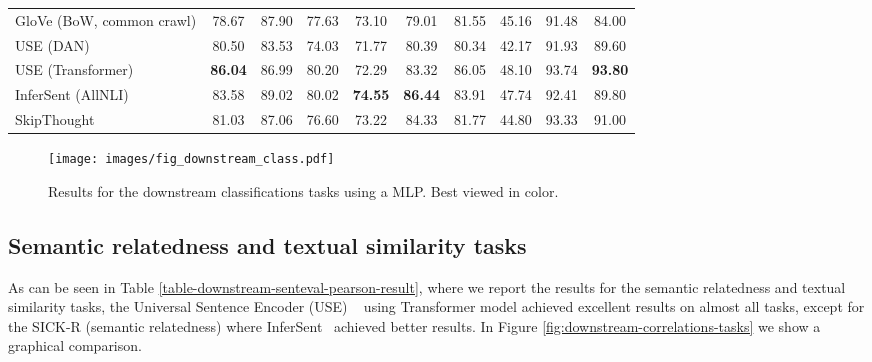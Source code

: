 \documentclass{article}
\begin{document}
\begin{table}[!htb]
{\begin{tabular}{lccccccccc}
GloVe (BoW, common crawl)                & 78.67 & 87.90 & 77.63 & 73.10 & 79.01  & 81.55 & 45.16 & 91.48 & 84.00 \\
USE (DAN)         & 80.50 & 83.53 & 74.03 & 71.77 & 80.39  & 80.34 & 42.17 & 91.93 & 89.60 \\
USE (Transformer)    & \textbf{86.04} & 86.99 & 80.20 & 72.29 & 83.32  & 86.05 & 48.10 & 93.74 & \textbf{93.80} \\
InferSent (AllNLI)            & 83.58 & 89.02 & 80.02 & \textbf{74.55} & \textbf{86.44}  & 83.91 & 47.74 & 92.41 & 89.80 \\
SkipThought          & 81.03 & 87.06 & 76.60 & 73.22 & 84.33  & 81.77 & 44.80 & 93.33 & 91.00 \\
\bottomrule
\end{tabular}}
\end{table}


\begin{figure}[!htb]
 \texttt{[image: images/fig\_downstream\_class.pdf]}
\caption{Results for the downstream classifications tasks using a MLP. Best viewed in color.}
\label{fig:downstream-classification-tasks}
\end{figure}





\subsection{Semantic relatedness and textual similarity tasks}
As can be seen in Table \ref{table-downstream-senteval-pearson-result}, where we report the results for the semantic relatedness and textual similarity tasks, the Universal Sentence Encoder (USE) ~\cite{DBLP:journals/corr/abs-1803-11175} using Transformer model achieved excellent results on almost all tasks, except for the SICK-R (semantic relatedness) where InferSent~\cite{conneau2017supervised} achieved better results.
In Figure \ref{fig:downstream-correlations-tasks} we show a graphical comparison.
\end{document}
